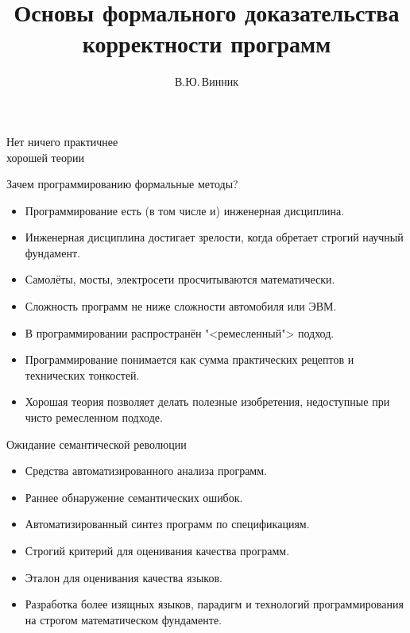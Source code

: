 \documentclass[landscape]{slides}
\begin{document}
\author{В.Ю.\,Винник}

\title{Основы формального доказательства корректности программ}

\date{}

\maketitle

\begin{slide}
\begin{center}
\begin{LARGE}
Нет ничего практичнее\\%
хорошей теории
\end{LARGE}
\end{center}
\end{slide}

\begin{slide}
Зачем программированию формальные методы?
\begin{itemize}
\item Программирование есть (в том числе и) инженерная дисциплина.
\item Инженерная дисциплина достигает зрелости, когда обретает строгий научный фундамент.
\item Самолёты, мосты, электросети просчитываются математически.
\item Сложность программ не ниже сложности автомобиля или ЭВМ.
\item В программировании распространён "<ремесленный"> подход.
\item Программирование понимается как сумма практических рецептов и технических тонкостей.
\item Хорошая теория позволяет делать полезные изобретения, недоступные при чисто ремесленном подходе.
\end{itemize}
\end{slide}

\begin{slide}
Ожидание семантической революции
\begin{itemize}
\item Средства автоматизированного анализа программ.
\item Раннее обнаружение семантических ошибок.
\item Автоматизированный синтез программ по спецификациям.
\item Строгий критерий для оценивания качества программ.
\item Эталон для оценивания качества языков.
\item Разработка более изящных языков, парадигм и технологий программирования на строгом математическом фундаменте.
\end{itemize}
\end{slide}
\end{document}
